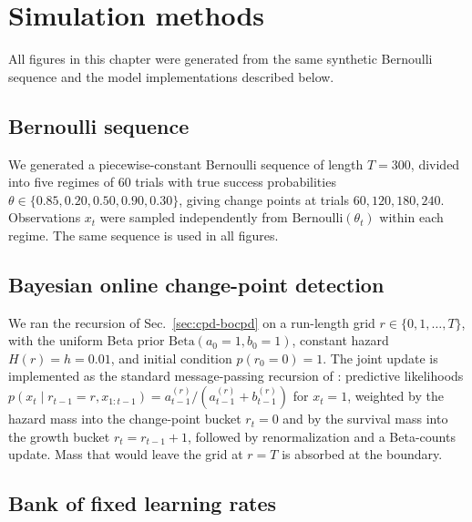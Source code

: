 \section{Simulation methods}
\label{sec:cpd-methods}


All figures in this chapter were generated from the same synthetic Bernoulli sequence and the model implementations described below.

\subsection{Bernoulli sequence}

We generated a piecewise-constant Bernoulli sequence of length $T=300$, divided into five regimes of $60$ trials with true success probabilities $\theta \in \{0.85, 0.20, 0.50, 0.90, 0.30\}$, giving change points at trials $60, 120, 180, 240$. Observations $x_t$ were sampled independently from $\mathrm{Bernoulli}(\theta_t)$ within each regime. The same sequence is used in all figures.

\subsection{Bayesian online change-point detection}

We ran the recursion of Sec.~\ref{sec:cpd-bocpd} on a run-length grid $r \in \{0, 1, \ldots, T\}$, with the uniform Beta prior $\mathrm{Beta}(a_0=1, b_0=1)$, constant hazard $H(r) = h = 0.01$, and initial condition $p(r_0=0) = 1$. The joint update is implemented as the standard message-passing recursion of \citet{Adams2007}: predictive likelihoods $p(x_t \mid r_{t-1}=r, x_{1:t-1}) = a_{t-1}^{(r)}/(a_{t-1}^{(r)}+b_{t-1}^{(r)})$ for $x_t=1$, weighted by the hazard mass into the change-point bucket $r_t=0$ and by the survival mass into the growth bucket $r_t = r_{t-1}+1$, followed by renormalization and a Beta-counts update. Mass that would leave the grid at $r=T$ is absorbed at the boundary.

\subsection{Bank of fixed learning rates}

